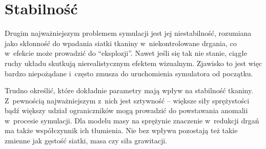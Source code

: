 		
		
		
		
		
		
		
		
		
		
	
	\section{Stabilność}
	\label{t:wyniki:stabilnosc}
	
		Drugim najważniejszym problemem symulacji jest jej niestabilność, rozumiana jako skłonność do wpadania siatki tkaniny w~niekontrolowane drgania, co w~efekcie może prowadzić do ``eksplozji''. Nawet jeśli się tak nie stanie, ciągłe ruchy układu skutkują nierealistycznym efektem wizualnym. Zjawisko to jest więc bardzo niepożądane i~często zmusza do uruchomienia symulatora od początku.
		
		Trudno określić, które dokładnie parametry mają wpływ na stabilność tkaniny. Z~pewnością najważniejszym z~nich jest sztywność -- większe siły sprężystości bądź większy udział ograniczników mogą prowadzić do powstawania anomalii w~procesie symulacji. Dla modelu masy na sprężynie znaczenie w~redukcji drgań ma także współczynnik ich tłumienia. Nie bez wpływu pozostają też takie zmienne jak gęstość siatki, masa czy siła grawitacji.
		
